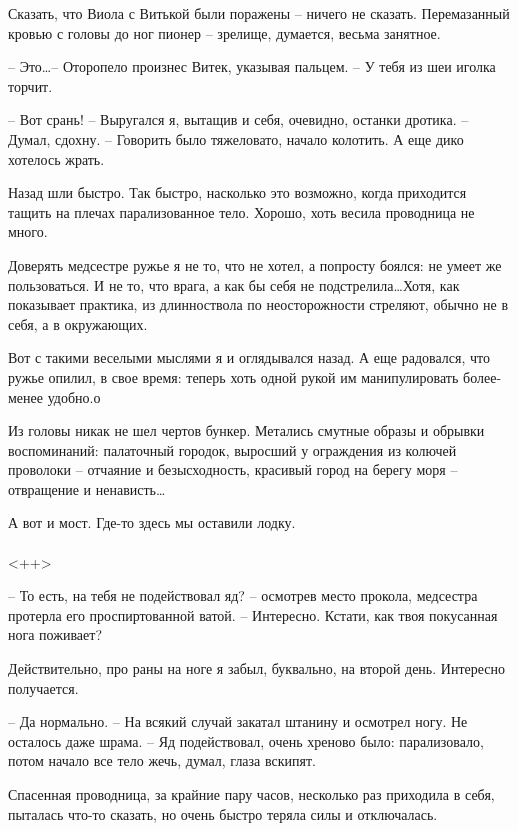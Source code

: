 \documentclass[a4paper]{book}
\begin{document}
Сказать, что Виола с Витькой были поражены -- ничего не сказать. Перемазанный кровью с головы до ног пионер -- зрелище, думается, весьма занятное. 

-- Это\ldots -- Оторопело произнес Витек, указывая пальцем.  -- У тебя из шеи иголка торчит. 

-- Вот срань! --  Выругался я, вытащив и себя, очевидно, останки дротика. -- Думал, сдохну. -- Говорить было тяжеловато, начало колотить. А еще дико хотелось жрать. 

Назад шли быстро. Так быстро, насколько это возможно, когда приходится тащить на плечах парализованное тело. Хорошо, хоть весила проводница не много. 

Доверять медсестре ружье я не то, что не хотел, а попросту боялся: не умеет же пользоваться. И не то, что врага, а как бы себя не подстрелила\ldots Хотя, как показывает практика, из длинноствола по неосторожности стреляют, обычно не в себя, а в окружающих.

Вот с такими веселыми мыслями я и оглядывался назад. А еще радовался, что ружье опилил, в свое время: теперь хоть одной рукой им манипулировать более-менее удобно.о

Из головы никак не шел чертов бункер. Метались смутные образы и обрывки воспоминаний: палаточный городок, выросший у ограждения из колючей проволоки -- отчаяние и безысходность, красивый город на берегу моря -- отвращение и ненависть\ldots 

А вот и мост. Где-то здесь мы оставили лодку. 

\paragraph{}<++>


-- То есть, на тебя не подействовал яд? -- осмотрев место прокола, медсестра протерла его проспиртованной ватой. -- Интересно. Кстати, как твоя покусанная нога поживает? 

Действительно, про раны на ноге я забыл, буквально, на второй день. Интересно получается. 

-- Да нормально. -- На всякий случай закатал штанину и осмотрел ногу. Не осталось даже шрама. -- Яд подействовал, очень хреново было: парализовало, потом начало все тело жечь, думал, глаза вскипят.

Спасенная проводница, за крайние пару часов, несколько раз приходила в себя, пыталась что-то сказать, но очень быстро теряла силы и отключалась. 
\end{document}
